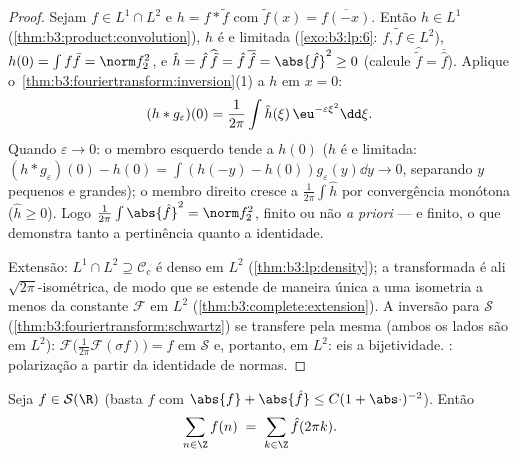 \begin{proof}
Sejam $f \in L^1\cap L^2$ e $h = f * \tilde f$ com $\tilde f(x) = \overline{f(-x)}$. Então $h \in L^1$ (\cref{thm:b3:product:convolution}), $h$ é
 e limitada (\cref{exo:b3:lp:6}: $f, \tilde f \in L^2$), $h(0) =
\int f\bar f = \norm f_2^2$, e $\hat h = \hat
f\,\widehat{\tilde f} = \hat f\,\overline{\hat f} =
\abs{\hat f}^2 \geq 0$ (calcule
$\widehat{\tilde f} =
\overline{\hat f}$). Aplique o~\cref{thm:b3:fouriertransform:inversion}(1) a $h$ em $x = 0$:
\[
(h * g_\varepsilon)(0) = \frac1{2\pi}\int \hat
h(\xi)\,\eu^{-\varepsilon\xi^2}\dd\xi .
\]
Quando $\varepsilon \to 0$: o membro esquerdo tende a $h(0)$ ($h$ é  e
limitada: $(h*g_\varepsilon)(0) - h(0) = \int(h(-y)
- h(0))g_\varepsilon(y)\dd y \to 0$, separando $y$ pequenos e grandes); o membro direito
cresce a $\frac1{2\pi}\int\hat h$ por convergência monótona ($\hat h \geq 0$). Logo $\frac1{2\pi}\int\abs{\hat f}^2 =
\norm f_2^2$, finito ou
não \emph{a priori} --- e finito, o que demonstra tanto a pertinência
quanto a identidade.

Extensão: $L^1\cap L^2 \supseteq \mathcal C_c$ é denso em $L^2$ (\cref{thm:b3:lp:density}); a transformada é
ali $\sqrt{2\pi}$-isométrica, de modo que se estende de maneira única a uma
isometria a menos da constante $\mathcal F$ em $L^2$ (\cref{thm:b3:complete:extension}). A
inversão para $\mathcal S$ (\cref{thm:b3:fouriertransform:schwartz}) se transfere pela mesma 
(ambos os lados são  em $L^2$): $\mathcal
F\bigl(\frac1{2\pi}\mathcal F(\sigma f)\bigr) = f$ em $\mathcal S$ e, portanto,
em $L^2$: eis a bijetividade. : polarização a
partir da identidade de normas.
\end{proof}

\begin{theorem}
\label{thm:b3:fouriertransform:poisson}
Seja $f \in \mathcal S(\R)$ (basta $f$  com $\abs{f} +
\abs{\hat f} \leq C(1 + \abs\cdot)^{-2}$). Então
\[
\sum_{n\in\Z} f(n) \;=\; \sum_{k\in\Z}\hat f(2\pi k) .
\]
\end{theorem}

